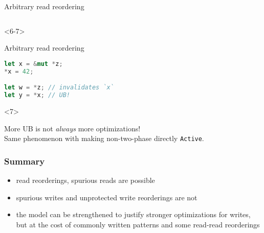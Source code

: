 \begin{frame}[fragile, t]
\begin{onlyenv}
\begin{block}{{\xmark} Arbitrary read reordering}
\begin{lstlisting}[language=rust]
            \end{lstlisting}
        \end{block}
    \end{onlyenv}

    \begin{onlyenv}<6-7>
        \begin{block}{{\xmark} Arbitrary read reordering}
            \begin{lstlisting}[language=rust]
let x = &mut *z;
*x = 42;

let w = *z; // invalidates `x`
let y = *x; // UB!
            \end{lstlisting}
        \end{block}
    \end{onlyenv}

    \begin{onlyenv}<7>
        \begin{block}{}
            More UB is not \textit{always} more optimizations!\\
            Same phenomenon with making non-two-phase directly \texttt{Active}.
        \end{block}
    \end{onlyenv}
\end{frame}

\begin{frame}
    \frametitle{Summary}
    \begin{itemize}
        \item read reorderings, spurious reads are possible
        \item spurious writes and unprotected write reorderings are not
        \item the model can be strengthened to justify stronger optimizations for
            writes, but at the cost of commonly written patterns and some read-read reorderings
    \end{itemize}
\end{frame}
